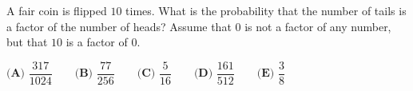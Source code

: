 A fair coin is flipped $10$ times. What is the probability that the number of tails is a factor of the number of heads? Assume that $0$ is not a factor of any number, but that $10$ is a factor of $0$.

$\textbf{(A) } \dfrac{317}{1024} \qquad \textbf{(B) } \dfrac{77}{256} \qquad \textbf{(C) } \dfrac{5}{16} \qquad \textbf{(D) } \dfrac{161}{512} \qquad \textbf{(E) } \dfrac{3}{8}$

